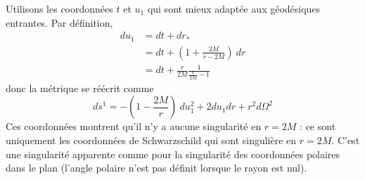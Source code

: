 \documentclass[a4paper,11pt]{report}
\begin{document}
            Utilisons les coordonnées $t$ et $u_1$ qui sont mieux adaptée aux géodésiques entrantes. Par définition, 
            \begin{align}
                du_1 &= dt+dr_*\\
                &= dt + \left( 1+\frac{2M}{r-2M} \right)~dr\\
                &= dt +\frac{r}{2M}\frac{1}{\frac{r}{2M}-1}
            \end{align}
            donc la métrique se réécrit comme
            \begin{equation}
                ds^1 = -\left( 1-\frac{2M}{r} \right)~du^2_1 + 2du_1dr+r^2d\Omega^2
            \end{equation}
            Ces coordonnées montrent qu'il n'y a aucune singularité en $r=2M$ : ce sont uniquement les coordonnées de Schwarzschild qui sont singulière en $r=2M$. C'est une singularité apparente comme pour la singularité des coordonnées polaires dans le plan (l'angle polaire n'est pas définit lorsque le rayon est nul).\\
            
            
\end{document}
